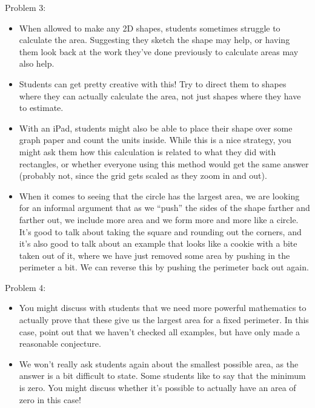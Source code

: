 \documentclass[noauthor,nooutcomes]{ximera}
\begin{document}
\begin{instructorNotes}
\begin{itemize}
\begin{enumerate}
\end{enumerate}
\end{itemize}

Problem 3:

\begin{itemize}
\item   When allowed to make any 2D shapes, students sometimes struggle to calculate the area.  Suggesting they sketch the shape may help, or having them look back at the work they've done previously to calculate areas may also help.  

\item Students can get pretty creative with this!  Try to direct them to shapes where they can actually calculate the area, not just shapes where they have to estimate.

\item With an iPad, students might also be able to place their shape over some graph paper and count the units inside. While this is a nice strategy, you might ask them how this calculation is related to what they did with rectangles, or whether everyone using this method would get the same answer (probably not, since the grid gets scaled as they zoom in and out).

\item When it comes to seeing that the circle has the largest area, we are looking for an informal argument that as we ``push'' the sides of the shape farther and farther out, we include more area and we form more and more like a circle.  It's good to talk about taking the square and rounding out the corners, and it's also good to talk about an example that looks like a cookie with a bite taken out of it, where we have just removed some area by pushing in the perimeter a bit. We can reverse this by pushing the perimeter back out again.
\end{itemize}

Problem 4:
\begin{itemize}
	\item You might discuss with students that we need more powerful mathematics to actually prove that these give us the largest area for a fixed perimeter.  In this case, point out that we haven't checked all examples, but have only made a reasonable conjecture.
	\item We won't really ask students again about the smallest possible area, as the answer is a bit difficult to state.  Some students like to say that the minimum is zero.  You might discuss whether it's possible to actually have an area of zero in this case!
\end{itemize}


\end{instructorNotes}
\end{document}
